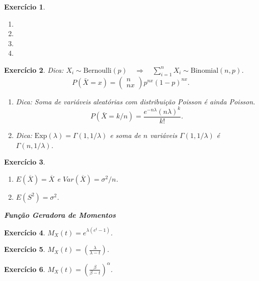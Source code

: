 \documentclass[letter,11pt]{article}
\newtheorem{exer}{Exercício}
\begin{document}
\medskip
\begin{exer} \rm
\begin{enumerate}[\bf(a)]
  \item 
  \item 
  \item 
  \item 
\end{enumerate}
\end{exer}


\medskip
\begin{exer} \rm
Dica: $X_i\sim \mathrm{Bernoulli}(p)\quad\Longrightarrow\quad\sum_{i=1}^n X_i \sim \mathrm{Binomial}(n,p)$. \[P(\bar X=x)=\left(\!\!\!\begin{array}{c} n \\ nx \end{array}\!\!\!\right)p^{nx}(1-p)^{nx}.\]
\begin{enumerate}[\bf(a)]
\item Dica: Soma de variáveis aleatórias com distribuição Poisson é ainda Poisson. 
\[P(\bar X=k/n)=\frac{e^{-n\lambda}(n\lambda)^{k}}{k!}.\]

\item Dica: $\mathrm{Exp}(\lambda)= \Gamma(1,1/\lambda)$ e soma de $n$ variáveis $\Gamma(1,1/\lambda)$ 
é $\Gamma(n, 1/\lambda)$.
\end{enumerate}
\end{exer}


\medskip
\begin{exer}
\begin{enumerate}[\bf(a)]
  \item $E(\overline{X}) = \overline{X}$ e $Var(\overline{X}) = \sigma^2 / n$.
  \item $E(S^2) = \sigma^2$.
\end{enumerate}
\end{exer}


\medskip
\medskip
\noindent \textit{\textbf{Função Geradora de Momentos}}

\medskip 
\begin{exer} \rm
$M_X(t) = e^{\lambda(e^t - 1)}$.
\end{exer}


\medskip
\begin{exer} \rm
$M_X(t) = \left( \frac{\lambda}{\lambda - t} \right)$.
\end{exer}


\medskip
\begin{exer} \rm
$M_X(t) = \left( \frac{\beta}{\beta - t} \right)^\alpha$.
\end{exer}
\end{document}

